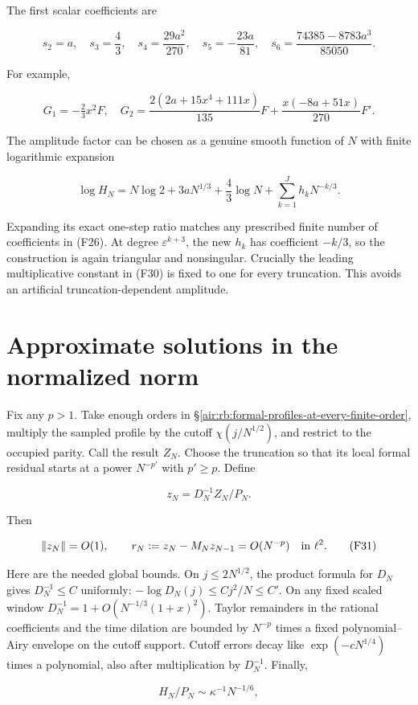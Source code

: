 \documentclass[11pt,letterpaper]{article}
\numberwithin{equation}{section}
\theoremstyle{remark}
\begin{document}
The first scalar coefficients are

\[
s_2=a,\quad s_3=\frac43,\quad s_4=\frac{29a^2}{270},\quad
s_5=-\frac{23a}{81},\quad
s_6=\frac{74385-8783a^3}{85050}.
\tag{F29}
\]

For example,

\[
G_1=-\tfrac23x^2F,\quad
G_2=\frac{2(2a+15x^4+111x)}{135}F
+\frac{x(-8a+51x)}{270}F'.
\]

The amplitude factor can be chosen as a genuine smooth function of \(N\) with finite logarithmic expansion

\[
\log H_N=N\log2+3aN^{1/3}+\frac43\log N
+\sum_{k=1}^J h_kN^{-k/3}.
\tag{F30}
\]

Expanding its exact one-step ratio matches any prescribed finite number of coefficients in (F26). At degree \(\varepsilon ^{k+3}\), the new \(h_k\) has coefficient \(-k/3\), so the construction is again triangular and nonsingular. Crucially the leading multiplicative constant in (F30) is fixed to one for every truncation. This avoids an artificial truncation-dependent amplitude.

\section{Approximate solutions in the normalized norm}\label{air:rb:approximate-solutions-in-the-normalized-norm}

Fix any \(p>1\). Take enough orders in \S\ref{air:rb:formal-profiles-at-every-finite-order}, multiply the sampled profile by the cutoff \(\chi (j/N^{1/2})\), and restrict to the occupied parity. Call the result \(Z_N\). Choose the truncation so that its local formal residual starts at a power \(N^{-p'}\) with \(p'\ge p\). Define

\[
z_N=D_N^{-1}Z_N/P_N.
\]

Then

\[
\|z_N\|=O(1),\qquad
r_N:=z_N-M_Nz_{N-1}=O(N^{-p})\quad\hbox{in }\ell^2.
\tag{F31}
\]

Here are the needed global bounds. On \(j\le 2N^{1/2}\), the product formula for \(D_N\) gives \(D_N^{-1}\le C\) uniformly: \(-\log D_N(j)\le Cj^2/N\le C'\). On any fixed scaled window \(D_N^{-1}=1+O(N^{-1/3}(1+x)^2)\). Taylor remainders in the rational coefficients and the time dilation are bounded by \(N^{-p}\) times a fixed polynomial--Airy envelope on the cutoff support. Cutoff errors decay like \(\exp(-cN^{1/4})\) times a polynomial, also after multiplication by \(D_N^{-1}\). Finally,

\[
H_N/P_N\sim\kappa^{-1}N^{-1/6},
\]
\end{document}

